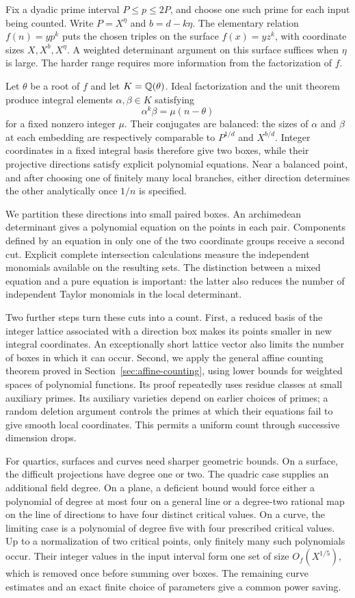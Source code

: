 Fix a dyadic prime interval $P\le p\le2P$, and choose one such prime
for each input being counted. Write $P=X^\eta$ and $b=d-k\eta$.
The elementary relation $f(n)=yp^k$ puts the chosen triples on the
surface $f(x)=yz^k$, with coordinate sizes $X,X^b,X^\eta$.
A weighted determinant argument on this surface suffices when $\eta$
is large. The harder range requires more information from the
factorization of $f$.

Let $\theta$ be a root of $f$ and let $K=\mathbb Q(\theta)$. Ideal
factorization and the unit theorem produce integral elements
$\alpha,\beta\in K$ satisfying
\[
 \alpha^k\beta=\mu(n-\theta)
\]
for a fixed nonzero integer $\mu$. Their conjugates are balanced:
the sizes of $\alpha$ and $\beta$ at each embedding are respectively
comparable to $P^{1/d}$ and $X^{b/d}$. Integer coordinates in a fixed
integral basis therefore give two boxes, while their projective
directions satisfy explicit polynomial equations. Near a balanced
point, and after choosing one of finitely many local branches, either
direction determines the other analytically once $1/n$ is specified.

We partition these directions into small paired boxes. An
archimedean determinant gives a polynomial equation on the points
in each pair. Components defined by an equation in only one of the
two coordinate groups receive a second cut. Explicit complete
intersection calculations measure the independent monomials available
on the resulting sets. The distinction between a mixed equation and a
pure equation is important: the latter also reduces the number of
independent Taylor monomials in the local determinant.

Two further steps turn these cuts into a count. First, a reduced basis
of the integer lattice associated with a direction box makes its
points smaller in new integral coordinates. An exceptionally short
lattice vector also limits the number of boxes in which it can occur.
Second, we apply the general affine counting theorem proved in
Section~\ref{sec:affine-counting}, using lower bounds
for weighted spaces of polynomial functions. Its proof repeatedly
uses residue classes at small auxiliary primes. Its auxiliary
varieties depend on earlier choices of primes; a random deletion
argument controls the primes at which their equations fail to give
smooth local coordinates. This permits a uniform count through
successive dimension drops.

For quartics, surfaces and curves need sharper geometric bounds.
On a surface, the difficult projections have degree one or two.
The quadric case supplies an additional field degree. On a plane,
a deficient bound would force either a polynomial of degree at most
four on a general line or a degree-two rational map on the line of
directions to have four distinct critical values. On a curve, the limiting
case is a polynomial of degree five with four prescribed critical
values. Up to a normalization of two critical points, only finitely
many such polynomials occur. Their integer values in the input interval
form one set of size $O_f(X^{1/5})$, which is removed once before summing
over boxes. The remaining curve estimates and an exact finite choice
of parameters give a common power saving.

